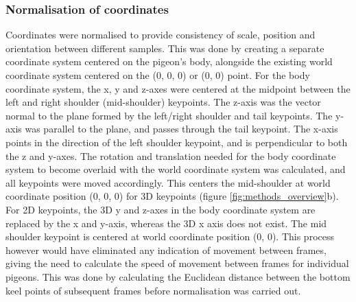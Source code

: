 \documentclass[11pt, letterpaper]{article} %
\begin{document}
        \subsubsection{Normalisation of coordinates}
        Coordinates were normalised to provide consistency of scale, position and orientation between different samples. This was done by creating a separate coordinate system centered on the pigeon's body, alongside the existing world coordinate system centered on the (0, 0, 0) or (0, 0) point. For the body coordinate system, the x, y and z-axes were centered at the midpoint between the left and right shoulder (mid-shoulder) keypoints. The z-axis was the vector normal to the plane formed by the left/right shoulder and tail keypoints. The y-axis was parallel to the plane, and passes through the tail keypoint. The x-axis points in the direction of the left shoulder keypoint, and is perpendicular to both the z and y-axes. The rotation and translation needed for the body coordinate system to become overlaid with the world coordinate system was calculated, and all keypoints were moved accordingly. This centers the mid-shoulder at world coordinate position (0, 0, 0) for 3D keypoints (figure \ref{fig:methods_overview}b). For 2D keypoints, the 3D y and z-axes in the body coordinate system are replaced by the x and y-axis, whereas the 3D x axis does not exist. The mid shoulder keypoint is centered at world coordinate position (0, 0). 
        This process however would have eliminated any indication of movement between frames, giving the need to calculate the speed of movement between frames for individual pigeons. This was done by calculating the Euclidean distance between the bottom keel points of subsequent frames before normalisation was carried out.
\end{document}
